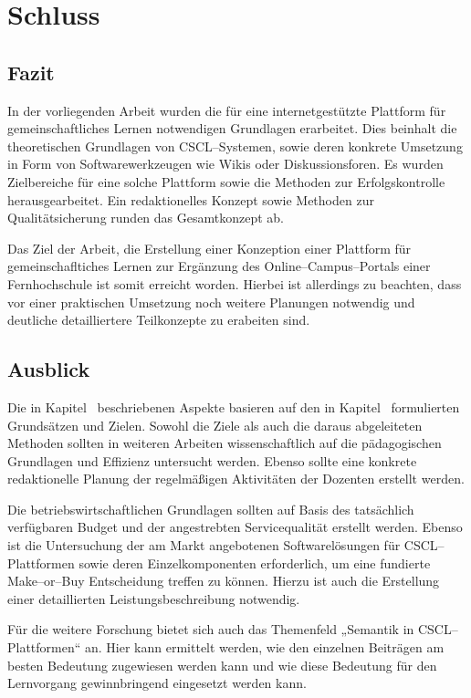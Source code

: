 \section{Schluss} %
\label{sec:schluss}

\subsection{Fazit} %
\label{sub:fazit}
In der vorliegenden Arbeit wurden die für eine internetgestützte Plattform für gemeinschaftliches Lernen notwendigen Grundlagen erarbeitet. Dies beinhalt die theoretischen Grundlagen von \ac{CSCL}–Systemen, sowie deren konkrete Umsetzung in Form von Softwarewerkzeugen wie Wikis oder Diskussionsforen. Es wurden Zielbereiche für eine solche Plattform sowie die Methoden zur Erfolgskontrolle herausgearbeitet. Ein redaktionelles Konzept sowie Methoden zur Qualitätsicherung runden das Gesamtkonzept ab.

Das Ziel der Arbeit, die Erstellung einer Konzeption einer Plattform für gemeinschafltiches Lernen zur Ergänzung des Online–Campus–Portals einer Fernhochschule ist somit erreicht worden. Hierbei ist allerdings zu beachten, dass vor einer praktischen Umsetzung noch weitere Planungen notwendig und deutliche detailliertere Teilkonzepte zu erabeiten sind. 

\subsection{Ausblick} %
\label{sub:ausblick}
Die in Kapitel~ beschriebenen Aspekte basieren auf den in Kapitel~ formulierten Grundsätzen und Zielen. Sowohl die Ziele als auch die daraus abgeleiteten Methoden sollten in weiteren Arbeiten wissenschaftlich auf die pädagogischen Grundlagen und Effizienz untersucht werden. Ebenso sollte eine konkrete redaktionelle Planung der regelmäßigen Aktivitäten der Dozenten erstellt werden.

Die betriebswirtschaftlichen Grundlagen sollten auf Basis des tatsächlich verfügbaren Budget und der angestrebten Servicequalität erstellt werden. Ebenso ist die Untersuchung der am Markt angebotenen Softwarelösungen für \ac{CSCL}–Plattformen sowie deren Einzelkomponenten erforderlich, um eine fundierte Make–or–Buy Entscheidung treffen zu können. Hierzu ist auch die Erstellung einer detaillierten Leistungsbeschreibung notwendig.

Für die weitere Forschung bietet sich auch das Themenfeld „Semantik in CSCL–Platt\-formen“ an. Hier kann ermittelt werden, wie den einzelnen Beiträgen am besten Bedeutung zugewiesen werden kann und wie diese Bedeutung für den Lernvorgang gewinnbringend eingesetzt werden kann.

